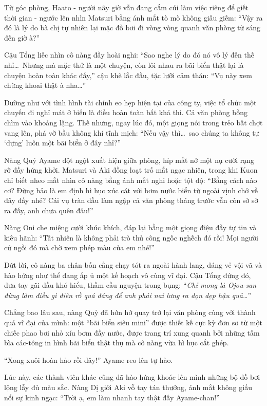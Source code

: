 \documentclass[../main.tex]{subfiles}
\begin{document}
Từ góc phòng, Haato - người nãy giờ vẫn đang cắm cúi làm việc riêng để giết thời gian - ngước lên nhìn Matsuri bằng ánh mắt tò mò không giấu giếm:
``Vậy ra đó là lý do bà chị tự nhiên lại mặc đồ bơi đi vòng vòng quanh văn phòng từ sáng đến giờ à?''

Cậu Tổng liếc nhìn cô nàng đầy hoài nghi:
``Sao nghe lý do đó nó vô lý đến thế nhỉ\dots\ Nhưng mà mặc thử là một chuyện, còn lôi nhau ra bãi biển thật lại là chuyện hoàn toàn khác đấy,'' cậu khẽ lắc đầu, tặc lưỡi cảm thán: ``Vụ này xem chừng khoai thật à nha\dots''

Dường như với tình hình tài chính eo hẹp hiện tại của công ty, việc tổ chức một chuyến đi nghỉ mát ở biển là điều hoàn toàn bất khả thi. Cả văn phòng bỗng chìm vào khoảng lặng. Thế nhưng, ngay lúc đó, một giọng nói trong trẻo bất chợt vang lên, phá vỡ bầu không khí tĩnh mịch:
``Nếu vậy thì\dots\ sao chúng ta không tự `dựng' luôn một bãi biển ở đây nhỉ?''

Nàng Quỷ Ayame đột ngột xuất hiện giữa phòng, híp mắt nở một nụ cười rạng rỡ đầy hứng khởi. Matsuri và Aki đồng loạt trố mắt ngạc nhiên, trong khi Kuon chỉ biết nheo mắt nhìn cô nàng bằng ánh mắt nghi hoặc tột độ:
``Bằng cách nào cơ? Đừng bảo là em định hì hục xúc cát với bơm nước biển từ ngoài vịnh chở về đây đấy nhé? Cái vụ tràn dầu làm ngập cả văn phòng tháng trước vẫn còn sờ sờ ra đấy, anh chưa quên đâu!''

Nàng Oni che miệng cười khúc khích, đáp lại bằng một giọng điệu đầy tự tin và kiêu hãnh:
``Tất nhiên là không phải trò thủ công ngốc nghếch đó rồi! Mọi người cứ ngồi đó mà chờ xem phép màu của em nhé!''

Dứt lời, cô nàng ba chân bốn cẳng chạy tót ra ngoài hành lang, dáng vẻ vội vã và hào hứng như thể đang ấp ủ một kế hoạch vô cùng vĩ đại. Cậu Tổng đứng đó, đưa tay gãi đầu khó hiểu, thầm cầu nguyện trong bụng: ``\textit{Chỉ mong là Ojou-san đừng làm điều gì điên rồ quá đáng để anh phải nai lưng ra dọn dẹp hậu quả\dots}''

\ct

Chẳng bao lâu sau, nàng Quỷ đã hớn hở quay trở lại văn phòng cùng với thành quả vĩ đại của mình: một ``bãi biển siêu mini'' được thiết kế cực kỳ đơn sơ từ một chiếc phao bơi nhỏ xíu bơm đầy nước, được trang trí xung quanh bởi những tấm bìa các-tông in hình bãi biển thật thụ mà cô nàng vừa hì hục cắt ghép.


``Xong xuôi hoàn hảo rồi đây!'' Ayame reo lên tự hào.

Lúc này, các thành viên khác cũng đã hào hứng khoác lên mình những bộ đồ bơi lộng lẫy đủ màu sắc. Nàng Dị giới Aki vỗ tay tán thưởng, ánh mắt không giấu nổi sự kinh ngạc:
``Trời ạ, em làm nhanh tay thật đấy Ayame-chan!''
\end{document}
